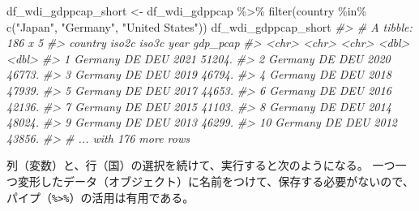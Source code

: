 \documentclass[
]{bxjsbook}
\newenvironment{Shaded}{\begin{snugshade}}{\end{snugshade}}
\newcommand{\CommentTok}[1]{\textcolor[rgb]{0.56,0.35,0.01}{\textit{#1}}}
\newcommand{\FunctionTok}[1]{\textcolor[rgb]{0.00,0.00,0.00}{#1}}
\newcommand{\NormalTok}[1]{#1}
\newcommand{\OtherTok}[1]{\textcolor[rgb]{0.56,0.35,0.01}{#1}}
\newcommand{\SpecialCharTok}[1]{\textcolor[rgb]{0.00,0.00,0.00}{#1}}
\newcommand{\StringTok}[1]{\textcolor[rgb]{0.31,0.60,0.02}{#1}}
\theoremstyle{definition}
\theoremstyle{definition}
\theoremstyle{definition}
\theoremstyle{definition}
\theoremstyle{remark}
\begin{document}
\begin{Shaded}
\begin{Highlighting}[]
\NormalTok{df\_wdi\_gdppcap\_short }\OtherTok{\textless{}{-}}\NormalTok{ df\_wdi\_gdppcap }\SpecialCharTok{\%\textgreater{}\%} 
  \FunctionTok{filter}\NormalTok{(country }\SpecialCharTok{\%in\%} \FunctionTok{c}\NormalTok{(}\StringTok{"Japan"}\NormalTok{, }\StringTok{"Germany"}\NormalTok{, }\StringTok{"United States"}\NormalTok{))}
\NormalTok{df\_wdi\_gdppcap\_short}
\CommentTok{\#\textgreater{} \# A tibble: 186 x 5}
\CommentTok{\#\textgreater{}    country iso2c iso3c  year gdp\_pcap}
\CommentTok{\#\textgreater{}    \textless{}chr\textgreater{}   \textless{}chr\textgreater{} \textless{}chr\textgreater{} \textless{}dbl\textgreater{}    \textless{}dbl\textgreater{}}
\CommentTok{\#\textgreater{}  1 Germany DE    DEU    2021   51204.}
\CommentTok{\#\textgreater{}  2 Germany DE    DEU    2020   46773.}
\CommentTok{\#\textgreater{}  3 Germany DE    DEU    2019   46794.}
\CommentTok{\#\textgreater{}  4 Germany DE    DEU    2018   47939.}
\CommentTok{\#\textgreater{}  5 Germany DE    DEU    2017   44653.}
\CommentTok{\#\textgreater{}  6 Germany DE    DEU    2016   42136.}
\CommentTok{\#\textgreater{}  7 Germany DE    DEU    2015   41103.}
\CommentTok{\#\textgreater{}  8 Germany DE    DEU    2014   48024.}
\CommentTok{\#\textgreater{}  9 Germany DE    DEU    2013   46299.}
\CommentTok{\#\textgreater{} 10 Germany DE    DEU    2012   43856.}
\CommentTok{\#\textgreater{} \# ... with 176 more rows}
\end{Highlighting}
\end{Shaded}

列（変数）と、行（国）の選択を続けて、実行すると次のようになる。
一つ一つ変形したデータ（オブジェクト）に名前をつけて、保存する必要がないので、パイプ（\texttt{\%\textgreater{}\%}）の活用は有用である。
\end{document}
